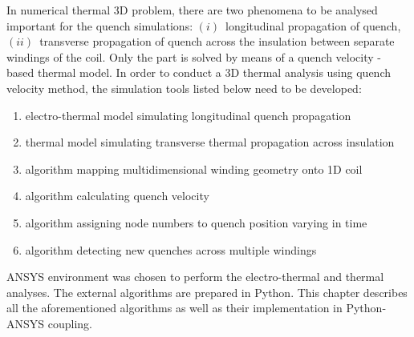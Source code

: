 
In numerical thermal 3D problem, there are two phenomena to be analysed important for the quench simulations: $(i)$~longitudinal propagation of quench, $(ii)$~transverse propagation of quench across the insulation between separate windings of the coil. Only the  part is solved by means of a quench velocity - based thermal model. In order to conduct a 3D thermal analysis using quench velocity method, the simulation tools listed below need to be developed: 
\begin{enumerate}
\item electro-thermal model simulating longitudinal quench propagation
\item thermal model simulating transverse thermal propagation across insulation
\item algorithm mapping multidimensional winding geometry onto 1D coil
\item algorithm calculating quench velocity
\item algorithm assigning node numbers to quench position varying in time
\item algorithm detecting new quenches across multiple windings
\end{enumerate}

ANSYS environment was chosen to perform the electro-thermal and thermal analyses. The external algorithms are prepared in Python. This chapter describes all the aforementioned algorithms as well as their implementation in Python-ANSYS coupling.